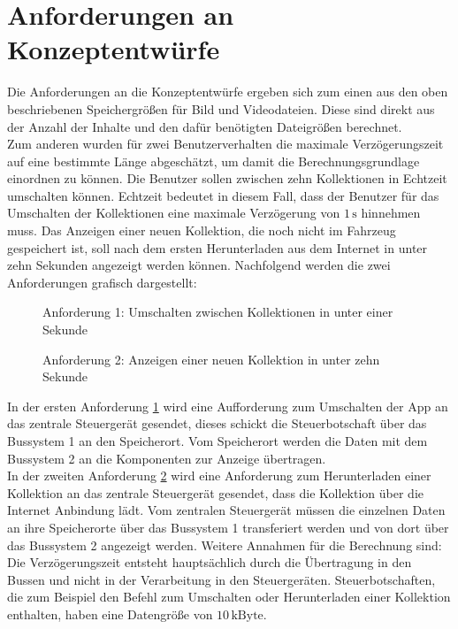 \section{Anforderungen an Konzeptentwürfe}
Die Anforderungen an die Konzeptentwürfe ergeben sich zum einen aus den oben beschriebenen Speichergrößen für Bild und Videodateien. Diese sind direkt aus der Anzahl der Inhalte und den dafür benötigten Dateigrößen berechnet. \\
Zum anderen wurden für zwei Benutzerverhalten die maximale Verzögerungszeit auf eine bestimmte Länge abgeschätzt, um damit die Berechnungsgrundlage einordnen zu können. Die Benutzer sollen zwischen zehn Kollektionen in Echtzeit umschalten können. Echtzeit bedeutet in diesem Fall, dass der Benutzer für das Umschalten der Kollektionen eine maximale Verzögerung von $ 1\,\mathrm{s} $ hinnehmen muss.
Das Anzeigen einer neuen Kollektion, die noch nicht im Fahrzeug gespeichert ist, soll nach dem ersten Herunterladen aus dem Internet in unter zehn Sekunden angezeigt werden können.
Nachfolgend werden die zwei Anforderungen grafisch dargestellt:
\begin{figure}[]
	\centering
	
	\caption[Anforderung 1: Umschalten zwischen Kollektionen in unter einer Sekunde]{Anforderung 1: Umschalten zwischen Kollektionen in unter einer Sekunde}
	\label{fig:anforderung1}
\end{figure}
\begin{figure}[]
	\centering
	
	\caption[Anforderung 2: Anzeigen einer neuen Kollektion in unter zehn Sekunde]{Anforderung 2: Anzeigen einer neuen Kollektion in unter zehn Sekunde}
	\label{fig:anforderung2}
\end{figure}
In der ersten Anforderung \ref{fig:anforderung1} wird eine Aufforderung zum Umschalten der App an das zentrale Steuergerät gesendet, dieses schickt die Steuerbotschaft über das Bussystem 1 an den Speicherort. Vom Speicherort werden die Daten mit dem Bussystem 2 an die Komponenten zur Anzeige übertragen. \\
In der zweiten Anforderung \ref{fig:anforderung2} wird eine Anforderung zum Herunterladen einer Kollektion an das zentrale Steuergerät gesendet, dass die Kollektion über die Internet Anbindung lädt. Vom zentralen Steuergerät müssen die einzelnen Daten an ihre Speicherorte über das Bussystem 1 transferiert werden und von dort über das Bussystem 2 angezeigt werden.
Weitere Annahmen für die Berechnung sind: 
Die Verzögerungszeit entsteht hauptsächlich durch die Übertragung in den Bussen und nicht in  der Verarbeitung in den Steuergeräten.
Steuerbotschaften, die zum Beispiel den Befehl zum Umschalten oder Herunterladen einer Kollektion enthalten, haben eine Datengröße von $ 10\,\mathrm{kByte} $.

